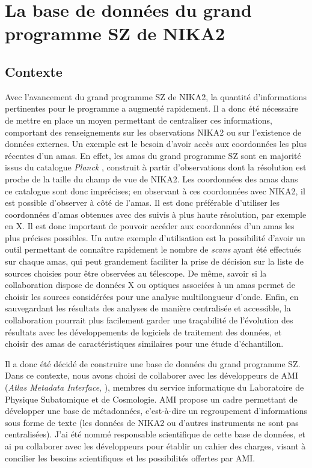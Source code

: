 \section{La base de données du grand programme SZ de NIKA2}
\label{sec:nk_ami}

\subsection{Contexte}

Avec l'avancement du grand programme SZ de NIKA2, la quantité d'informations pertinentes pour le programme a augmenté rapidement.
Il a donc été nécessaire de mettre en place un moyen permettant de centraliser ces informations, comportant des renseignements sur les observations NIKA2 ou sur l'existence de données externes.
Un exemple est le besoin d'avoir accès aux coordonnées les plus récentes d'un amas.
En effet, les amas du grand programme SZ sont en majorité issus du catalogue \textit{Planck} \cite{planck_collaboration_planck_2016-2}, construit à partir d'observations dont la résolution est proche de la taille du champ de vue de NIKA2.
Les coordonnées des amas dans ce catalogue sont donc imprécises; en observant à ces coordonnées avec NIKA2, il est possible d'observer à côté de l'amas.
Il est donc préférable d'utiliser les coordonnées d'amas obtenues avec des suivis à plus haute résolution, par exemple en X.
Il est donc important de pouvoir accéder aux coordonnées d'un amas les plus précises possibles.
Un autre exemple d'utilisation est la possibilité d'avoir un outil permettant de connaître rapidement le nombre de \textit{scans} ayant été effectués sur chaque amas, qui peut grandement faciliter la prise de décision sur la liste de sources choisies pour être observées au télescope.
De même, savoir si la collaboration dispose de données X ou optiques associées à un amas permet de choisir les sources considérées pour une analyse multilongueur d'onde.
Enfin, en sauvegardant les résultats des analyses de manière centralisée et accessible, la collaboration pourrait plus facilement garder une traçabilité de l'évolution des résultats avec les développements de logiciels de traitement des données, et choisir des amas de caractéristiques similaires pour une étude d'échantillon.

Il a donc été décidé de construire une base de données du grand programme SZ.
Dans ce contexte, nous avons choisi de collaborer avec les développeurs de AMI (\textit{Atlas Metadata Interface}, \cite{albrand_atlas_2010}), membres du service informatique du Laboratoire de Physique Subatomique et de Cosmologie.
AMI propose un cadre permettant de développer une base de métadonnées, c'est-à-dire un regroupement d'informations sous forme de texte (les données de NIKA2 ou d'autres instruments ne sont pas centralisées).
J'ai été nommé responsable scientifique de cette base de données, et ai pu collaborer avec les développeurs pour établir un cahier des charges, visant à concilier les besoins scientifiques et les possibilités offertes par AMI.

